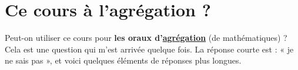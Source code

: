 
\section*{Ce cours à l'agrégation ?}

Peut-on utiliser ce cours pour \textbf{les oraux d'\href{http://agreg.org/}{agrégation}} (de mathématiques) ?  Cela est une question qui m'est arrivée quelque fois.  La réponse courte est : « je ne sais pas », et voici quelques éléments de réponses plus longues.

